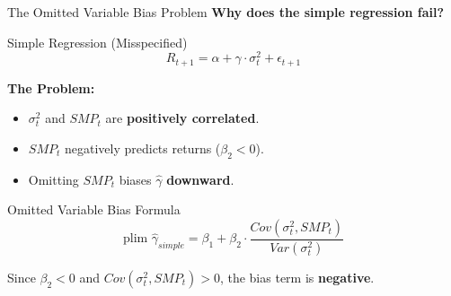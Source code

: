 \documentclass{beamer}
\begin{document}
\begin{frame}{The Omitted Variable Bias Problem}
    \textbf{Why does the simple regression fail?}
    
    \begin{block}{Simple Regression (Misspecified)}
        \begin{equation}
            R_{t+1} = \alpha + \gamma \cdot \sigma_t^2 + \epsilon_{t+1}
        \end{equation}
    \end{block}
    
    \textbf{The Problem:}
    \begin{itemize}
        \item $\sigma_t^2$ and $SMP_t$ are \textbf{positively correlated}.
        \item $SMP_t$ negatively predicts returns ($\beta_2 < 0$).
        \item Omitting $SMP_t$ biases $\hat{\gamma}$ \textbf{downward}.
    \end{itemize}
    
    \begin{block}{Omitted Variable Bias Formula}
        \begin{equation}
            \text{plim } \hat{\gamma}_{simple} = \beta_1 + \beta_2 \cdot \frac{Cov(\sigma_t^2, SMP_t)}{Var(\sigma_t^2)}
        \end{equation}
    \end{block}
    
    Since $\beta_2 < 0$ and $Cov(\sigma_t^2, SMP_t) > 0$, the bias term is \textbf{negative}.
\end{frame}
\end{document}
